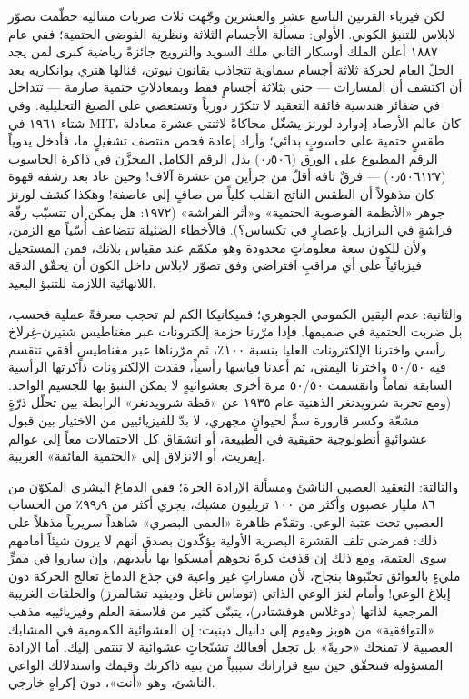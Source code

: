 \documentclass[12pt,a4paper,openany]{book}
\begin{document}
لكن فيزياء القرنين التاسع عشر والعشرين وجّهت ثلاث ضربات متتالية حطّمت تصوّر لابلاس للتنبؤ الكوني. الأولى: مسألة الأجسام الثلاثة ونظرية الفوضى الحتمية؛ ففي عام ١٨٨٧ أعلن الملك أوسكار الثاني ملك السويد والنرويج جائزةً رياضية كبرى لمن يجد الحلّ العام لحركة ثلاثة أجسام سماوية تتجاذب بقانون نيوتن، فنالها هنري بوانكاريه بعد أن اكتشف أن المسارات — حتى بثلاثة أجسامٍ فقط وبمعادلاتٍ حتمية صارمة — تتداخل في ضفائر هندسية فائقة التعقيد لا تتكرّر دورياً وتستعصي على الصيغ التحليلية. وفي شتاء ١٩٦١ في MIT، كان عالم الأرصاد إدوارد لورنز يشغّل محاكاةً لاثنتي عشرة معادلة طقسٍ حتمية على حاسوبٍ بدائي؛ وأراد إعادة فحص منتصف تشغيلٍ ما، فأدخل يدوياً الرقم المطبوع على الورق (٠٫٥٠٦) بدل الرقم الكامل المخزَّن في ذاكرة الحاسوب (٠٫٥٠٦١٢٧) — فرقٌ تافه أقلّ من جزأين من عشرة آلاف! وحين عاد بعد رشفة قهوة كان مذهولاً أن الطقس الناتج انقلب كلياً من صافٍ إلى عاصفة! وهكذا كشف لورنز جوهر «الأنظمة الفوضوية الحتمية» و«أثر الفراشة» (١٩٧٢: هل يمكن أن تتسبّب رفّة فراشةٍ في البرازيل بإعصارٍ في تكساس؟). فالأخطاء الضئيلة تتضاعف أُسّياً مع الزمن، ولأن للكون سعة معلوماتٍ محدودة وهو مكمّم عند مقياس بلانك، فمن المستحيل فيزيائياً على أي مراقبٍ افتراضي وفق تصوّر لابلاس داخل الكون أن يحقّق الدقة اللانهائية اللازمة للتنبؤ البعيد.


والثانية: عدم اليقين الكمومي الجوهري؛ فميكانيكا الكم لم تحجب معرفةً عملية فحسب، بل ضربت الحتمية في صميمها. فإذا مرّرنا حزمة إلكترونات عبر مغناطيس شتيرن-غِرلاخ رأسي واخترنا الإلكترونات العليا بنسبة ١٠٠٪، ثم مرّرناها عبر مغناطيسٍ أفقي تنقسم فيه ٥٠/٥٠ واخترنا اليمنى، ثم أعدنا قياسها رأسياً، فقدت الإلكترونات ذاكرتها الرأسية السابقة تماماً وانقسمت ٥٠/٥٠ مرة أخرى بعشوائيةٍ لا يمكن التنبؤ بها للجسيم الواحد. (ومع تجربة شرويدنغر الذهنية عام ١٩٣٥ عن «قطة شرويدنغر» الرابطة بين تحلّل ذرّةٍ مشعّة وكسر قارورة سمٍّ لحيوانٍ مجهري، لا بدّ للفيزيائيين من الاختيار بين قبول عشوائيةٍ أنطولوجية حقيقية في الطبيعة، أو انشقاق كل الاحتمالات معاً إلى عوالم إيفريت، أو الانزلاق إلى «الحتمية الفائقة» الغريبة.


والثالثة: التعقيد العصبي الناشئ ومسألة الإرادة الحرة؛ ففي الدماغ البشري المكوّن من ٨٦ مليار عصبون وأكثر من ١٠٠ تريليون مشبك، يجري أكثر من ٩٩٫٩٪ من الحساب العصبي تحت عتبة الوعي. وتقدّم ظاهرة «العمى البصري» شاهداً سريرياً مذهلاً على ذلك: فمرضى تلف القشرة البصرية الأولية يؤكّدون بصدق أنهم لا يرون شيئاً أمامهم سوى العتمة، ومع ذلك إن قذفت كرةً نحوهم أمسكوا بها بأيديهم، وإن ساروا في ممرٍّ مليءٍ بالعوائق تجنّبوها بنجاح، لأن مساراتٍ غير واعية في جذع الدماغ تعالج الحركة دون إبلاغ الوعي! وأمام لغز الوعي الذاتي (توماس ناغل وديفيد تشالمرز) والحلقات الغريبة المرجعية لذاتها (دوغلاس هوفشتادر)، يتبنّى كثير من فلاسفة العلم وفيزيائييه مذهب «التوافقية» من هوبز وهيوم إلى دانيال دينيت: إن العشوائية الكمومية في المشابك العصبية لا تمنحك «حريةً» بل تجعل أفعالك تشنّجاتٍ عشوائية لا تنتمي إليك. أما الإرادة المسؤولة فتتحقّق حين تنبع قراراتك سببياً من بنية ذاكرتك وقيمك واستدلالك الواعي الناشئ، وهو «أنت»، دون إكراهٍ خارجي.
\end{document}
